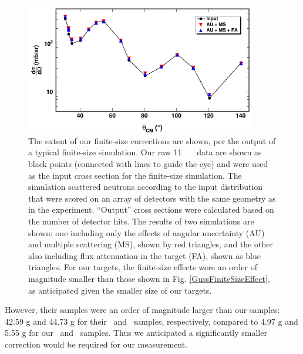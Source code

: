 \begin{figure}[tb]
    \centering
    \includegraphics[width=0.9\textwidth]{figures/finiteSizeCorrections.png}
    \caption[Effect of finite-size corrections on our neutron \el\ measurement]
    {
        The extent of our finite-size corrections are shown, per the output
        of a typical finite-size simulation. Our raw
        11 \mega\electronvolt\ \snFour\ \el\ data
        are shown as black points (connected with lines to guide the eye) and
        were used as the input cross section for the finite-size simulation.
        The simulation scattered neutrons according to the input distribution
        that were scored on an array of detectors with the same geometry
        as in the experiment. ``Output'' cross sections were calculated based on
        the number of detector hits. The results of two simulations are shown:
        one including only the effects of
        angular uncertainty (AU) and multiple scattering (MS), shown by red
        triangles, and the other also including flux attenuation in the target
        (FA), shown as blue triangles. For our targets, the finite-size effects
        were an order of magnitude smaller
        than those shown in Fig. \ref{GussFiniteSizeEffect},
        as anticipated given the smaller size of our targets.
    }
    \label{finiteSizeCorrections}
\end{figure}
However, their samples
were an order of magnitude larger than our
samples: 42.59 g and 44.73 g for their \snSixteen\ and \snTwenty\ samples,
respectively, compared to 4.97 g and 5.55 g for our \snTwelve\ and \snFour\
samples. Thus we anticipated a significantly smaller correction would be
required for our measurement.
